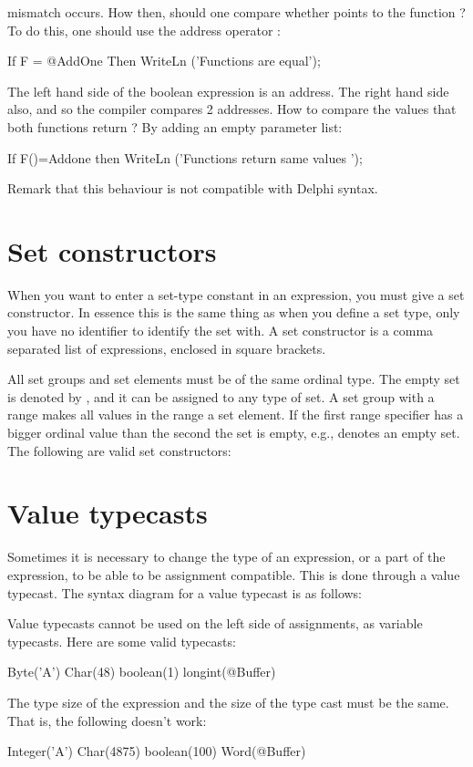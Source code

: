 \documentclass{report}
\begin{document}
mismatch occurs.
How then, should one compare whether  points to the function
 ? To do this, one should use the address operator :
\begin{listing}
If F = @AddOne Then
  WriteLn ('Functions are equal');
\end{listing}
The left hand side of the boolean expression is an address. The right hand
side also, and so the compiler compares 2 addresses.
How to compare the values that both functions return ? By adding an empty
parameter list:
\begin{listing}
  If F()=Addone then
    WriteLn ('Functions return same values ');
\end{listing}
Remark that this behaviour is not compatible with Delphi syntax.
\section{Set constructors}
When you want to enter a set-type constant in an expression, you must give a
set constructor. In essence this is the same thing as when you define a set
type, only you have no identifier to identify the set with.
A set constructor is a comma separated list of expressions, enclosed in
square brackets.

All set groups and set elements must be of the same ordinal type.
The empty set is denoted by \var{[]}, and it can be assigned to any type of
set. A set group with a range  \var{[A..Z]} makes all values in the range a
set element. If the first range specifier has a bigger ordinal value than
the second the set is empty, e.g., \var{[Z..A]} denotes an empty set.
The following are valid set constructors:
\begin{listing}
\end{listing}
\section{Value typecasts}
Sometimes it is necessary to change the type of an expression, or a part of
the expression, to be able to be assignment compatible. This is done through
a value typecast. The syntax diagram for a value typecast is as follows:

Value typecasts cannot be used on the left side of assignments, as variable
typecasts.
Here are some valid typecasts:
\begin{listing}
Byte('A')
Char(48)
boolean(1)
longint(@Buffer)
\end{listing}
The type size of the expression and the size of the type cast must be the
same. That is, the following doesn't work:
\begin{listing}
Integer('A')
Char(4875)
boolean(100)
Word(@Buffer)
\end{listing}
\end{document}
